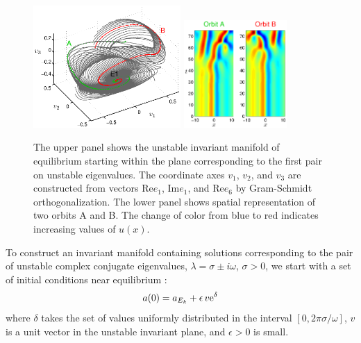\begin{figure}[t]
\begin{center} 
\includegraphics[width=0.5\textwidth]{figs/ks22_E1_plane1_manifold.eps}
\includegraphics[width=0.35\textwidth]{figs/ks22_E1_plane1_orbits.eps}
\end{center}
\caption{
The upper panel shows the unstable
invariant manifold of equilibrium  starting within the plane
corresponding to the first pair on unstable eigenvalues. The
coordinate axes $v_1$, $v_2$, and $v_3$ are constructed from vectors
$\mathrm{Re} e_1$, $\mathrm{Im} e_1$, and $\mathrm{Re} e_6$
by Gram-Schmidt orthogonalization.
The lower panel shows spatial representation of two orbits A and B.
The change of color from blue to red indicates increasing values of
$u(x)$.}
\label{f:KS22E1man1}
\end{figure}

To construct an invariant manifold containing solutions
corresponding to the pair of unstable complex conjugate eigenvalues,
$\lambda = \sigma\pm i\omega$, $\sigma > 0$, we start with a set of
initial conditions near equilibrium :
\[ a(0) = a_{{E_{k}}} + \epsilon\,v\mathrm{e}^{\delta}\]
where $\delta$ takes the set of values uniformly distributed in the
interval $[0,2\pi\sigma/\omega]$, $v$ is a unit vector in the
unstable invariant plane, and $\epsilon > 0$ is small.

